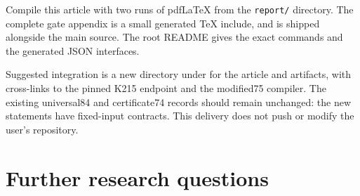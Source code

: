 \documentclass[11pt]{article}
\theoremstyle{definition}
\begin{document}
Compile this article with two runs of pdfLaTeX from the \texttt{report/}
directory. The complete gate appendix is a small generated TeX include,
and is shipped alongside the main source. The root README gives the exact
commands and the generated JSON interfaces.

Suggested integration is a new directory under
for the article and artifacts, with cross-links to the pinned K215 endpoint
and the modified75 compiler. The existing universal84 and certificate74
records should remain unchanged: the new statements have fixed-input
contracts. This delivery does not push or modify the user's repository.

\section{Further research questions}
\end{document}
